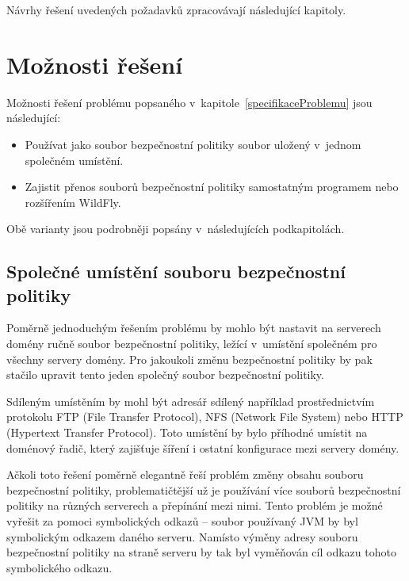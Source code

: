 Návrhy řešení uvedených požadavků zpracovávají následující kapitoly.

\section{Možnosti řešení} \label{vycetMoznostiReseni}

Možnosti řešení problému popsaného v~kapitole~\ref{specifikaceProblemu} jsou následující:

\begin{itemize}
  \item Používat jako soubor bezpečnostní politiky soubor uložený v~jednom společném umístění.
  \item Zajistit přenos souborů bezpečnostní politiky samostatným programem nebo rozšířením WildFly.
\end{itemize}

Obě varianty jsou podrobněji popsány v~následujících podkapitolách.

\subsection{Společné umístění souboru bezpečnostní politiky} \label{reseniSpolecne}

Poměrně jednoduchým řešením problému by mohlo být nastavit na serverech domény ručně soubor bezpečnostní politiky, ležící v~umístění společném pro všechny servery domény.
Pro jakoukoli změnu bezpečnostní politiky by pak stačilo upravit tento jeden společný soubor bezpečnostní politiky.

Sdíleným umístěním by mohl být adresář sdílený například prostřednictvím protokolu FTP (File Transfer Protocol), NFS (Network File System) nebo HTTP (Hypertext Transfer Protocol).
Toto umístění by bylo příhodné umístit na doménový řadič, který zajišťuje šíření i ostatní konfigurace mezi servery domény.

Ačkoli toto řešení poměrně elegantně řeší problém změny obsahu souboru bezpečnostní politiky, problematičtější už je používání více souborů bezpečnostní politiky na různých serverech a přepínání mezi nimi.
Tento problém je možné vyřešit za pomoci symbolických odkazů -- soubor používaný JVM by byl symbolickým odkazem daného serveru.
Namísto výměny adresy souboru bezpečnostní politiky na straně serveru by tak byl vyměňován cíl odkazu tohoto symbolického odkazu.

